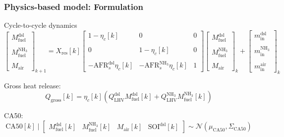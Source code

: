 \documentclass[aspectratio=169, 10pt]{beamer}
\newcommand{\mdies}{m_{\text{in}}^{\text{dsl}}}
\newcommand{\mammo}{m_{\text{in}}^{\text{NH$_3$}}}
\newcommand{\mair}{m_{\text{in}}^{\text{air}}}
\newcommand{\Mdies}{M_{\text{fuel}}^{\text{dsl}}}
\newcommand{\Mammo}{M_{\text{fuel}}^{\text{NH$_3$}}}
\newcommand{\Mair}{M_{\text{air}}}
\newcommand{\AFRds}{\text{AFR}_s^{\text{dsl}}}
\newcommand{\AFRas}{\text{AFR}_s^{\text{NH$_3$}}}
\newcommand{\Qlhvd}{Q_{\text{LHV}}^{\text{dsl}}}
\newcommand{\Qlhva}{Q_{\text{LHV}}^{\text{NH$_3$}}}
\newcommand{\Xresi}{X_{\text{res}}}
\newcommand{\Qgros}{Q_{\text{gross}}}
\newcommand{\SOI}{\text{SOI}^{\text{dsl}}}
\begin{document}
\begin{frame}
\frametitle{Physics-based model: Formulation}
Cycle-to-cycle dynamics
\begin{equation*}
    \begin{bmatrix}
        \Mdies \\ \\ \Mammo \\ \\ \Mair
    \end{bmatrix}_{k+1} = 
    \Xresi[k]
    \begin{bmatrix}
        1 - \eta_c[k] & 0 & 0\\ \\
        0 & 1 - \eta_c[k] & 0 \\ \\
        -\AFRds\eta_c[k] & -\AFRas\eta_c[k] & 1
    \end{bmatrix}
    \begin{bmatrix}
        \Mdies \\ \\ \Mammo \\ \\ \Mair
    \end{bmatrix}_{k} +
    \begin{bmatrix}
        \mdies \\ \\ \mammo \\ \\ \mair
    \end{bmatrix}_{k}
\end{equation*}

Gross heat release:
\begin{equation*}
    \Qgros[k] = \eta_c[k](\Qlhvd\Mdies[k] + \Qlhva\Mammo[k])
\end{equation*}

CA50:
\begin{equation*}
    \text{CA50}[k] \mid \begin{bmatrix} \Mdies[k] & \Mammo[k] & \Mair[k]& \SOI[k] \end{bmatrix} \sim \mathcal{N}(\mu_\text{CA50}, \Sigma_\text{CA50})
\end{equation*}

\end{frame}

%
%
\end{document}
